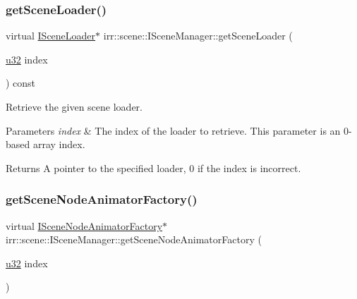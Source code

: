 \subsubsection{\texorpdfstring{get\+Scene\+Loader()}{getSceneLoader()}\hspace{0.1cm}{\footnotesize\ttfamily [2/2]}}
{\footnotesize\ttfamily virtual \hyperlink{classirr_1_1scene_1_1ISceneLoader}{I\+Scene\+Loader}$\ast$ irr\+::scene\+::\+I\+Scene\+Manager\+::get\+Scene\+Loader (\begin{DoxyParamCaption}\item[{\hyperlink{namespaceirr_a0416a53257075833e7002efd0a18e804}{u32}}]{index }\end{DoxyParamCaption}) const\hspace{0.3cm}{\ttfamily [pure virtual]}}



Retrieve the given scene loader. 


\begin{DoxyParams}{Parameters}
{\em index} & The index of the loader to retrieve. This parameter is an 0-\/based array index. \\
\hline
\end{DoxyParams}
\begin{DoxyReturn}{Returns}
A pointer to the specified loader, 0 if the index is incorrect. 
\end{DoxyReturn}
\mbox{\label{classirr_1_1scene_1_1ISceneManager_a96d8272b74bd0adc9138f17e832dc887}} 
\subsubsection{\texorpdfstring{get\+Scene\+Node\+Animator\+Factory()}{getSceneNodeAnimatorFactory()}\hspace{0.1cm}{\footnotesize\ttfamily [1/2]}}
{\footnotesize\ttfamily virtual \hyperlink{classirr_1_1scene_1_1ISceneNodeAnimatorFactory}{I\+Scene\+Node\+Animator\+Factory}$\ast$ irr\+::scene\+::\+I\+Scene\+Manager\+::get\+Scene\+Node\+Animator\+Factory (\begin{DoxyParamCaption}\item[{\hyperlink{namespaceirr_a0416a53257075833e7002efd0a18e804}{u32}}]{index }\end{DoxyParamCaption})\hspace{0.3cm}{\ttfamily [pure virtual]}}



